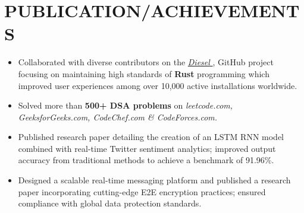 \documentclass[letterpaper,10pt]{article}
\newcommand{\resumeItem}[1]{
  \item\small{
    {#1 \vspace{-2pt}}
  }
}
\newcommand{\resumeItemListStart}{\begin{itemize}}
\newcommand{\resumeItemListEnd}{\end{itemize}\vspace{-5pt}}
\begin{document}
\section{PUBLICATION/ACHIEVEMENTS}
\resumeItemListStart
  \resumeItem{\normalsize{Collaborated with diverse contributors on the \href{https://github.com/diesel-rs/diesel}{\textit{Diesel} {\raisebox{-0.1\height}\faExternalLink}}, GitHub project focusing on maintaining high standards of \textbf{Rust} programming which improved user experiences among over 10,000 active installations worldwide.}}
  \vspace{-4pt}
  \resumeItem{\normalsize{Solved more than \textbf{500+ DSA problems} on \textit{leetcode.com, GeeksforGeeks.com, CodeChef.com \& CodeForces.com.}}}
  \vspace{-4pt}
  \resumeItem{\normalsize{Published research paper detailing the creation of an LSTM RNN model combined with real-time Twitter sentiment analytics; improved output accuracy from traditional methods to achieve a benchmark of 91.96\%.}}
  \vspace{-4pt}
  \resumeItem{\normalsize{Designed a scalable real-time messaging platform and published a research paper incorporating cutting-edge E2E encryption practices; ensured compliance with global data protection standards.}}
  \vspace{-4pt}
\resumeItemListEnd
\end{document}
